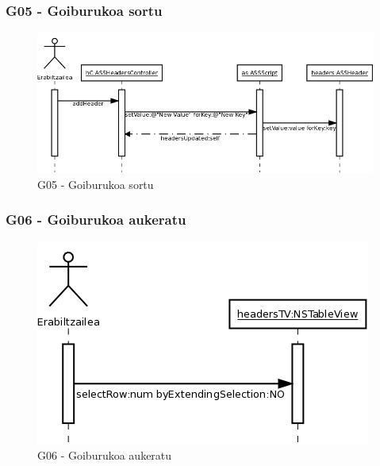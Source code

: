\subsubsection{G05 - Goiburukoa sortu}
\begin{figure}[htp]
\begin{center}
\includegraphics[scale=0.35]{Pictures/Chapter4/Diseinua/G05.png}
\caption{G05 - Goiburukoa sortu}
\label{g05d}
\end{center}
\end{figure}

\newpage
\subsubsection{G06 - Goiburukoa aukeratu}
\begin{figure}[htp]
\begin{center}
\includegraphics[scale=0.4]{Pictures/Chapter4/Diseinua/G06.png}
\caption{G06 - Goiburukoa aukeratu}
\label{g06d}
\end{center}
\end{figure}


